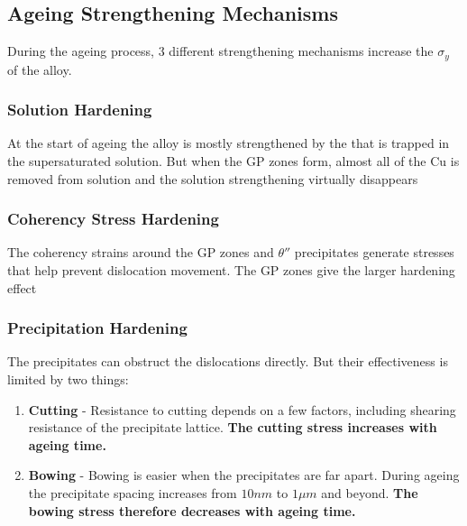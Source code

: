 
\subsection{Ageing Strengthening Mechanisms} %
\label{sub:ageing_strengthening_mechanisms}



During the ageing process, 3 different strengthening mechanisms increase the $\sigma_y$ of the alloy.

\subsubsection{Solution Hardening} %
\label{ssub:solution_hardening}
At the start of ageing the alloy is mostly strengthened by the  that is trapped in the supersaturated solution. But when the GP zones form, almost all of the Cu is removed from solution and the solution strengthening virtually disappears 

\subsubsection{Coherency Stress Hardening} %
\label{ssub:coherency_stress_hardening}
The coherency strains around the GP zones and $\theta''$ precipitates generate stresses that help prevent dislocation movement. The GP zones give the larger hardening effect


\subsubsection{Precipitation Hardening} %
\label{ssub:precipitation_hardening}
The precipitates can obstruct the dislocations directly. But their effectiveness is limited by two things:
\begin{enumerate}
  \item \textbf{Cutting} - Resistance to cutting depends on a few factors, including shearing resistance of the precipitate lattice. \textbf{The cutting stress increases with ageing time.}
  \item \textbf{Bowing} - Bowing is easier when the precipitates are far apart. During ageing the precipitate spacing increases from $10nm$ to $1\mu m$ and beyond. \textbf{The bowing stress therefore decreases with ageing time.}
\end{enumerate}


